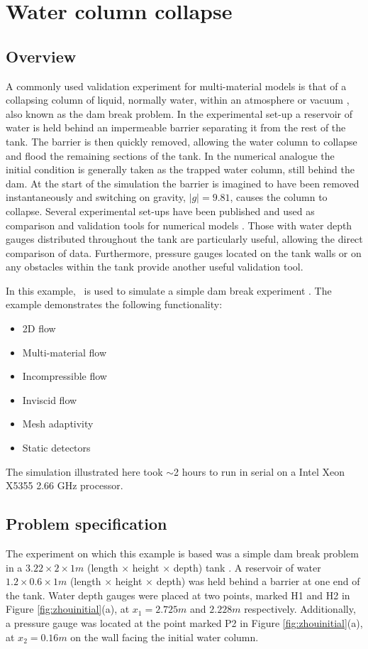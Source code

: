 \section{Water column collapse}
\label{sec:water_collapse}

\subsection{Overview}
A commonly used validation experiment for multi-material models is that of a collapsing column of liquid, normally water, within an atmosphere or vacuum \citep{lakehal_interface_2002}, also known as the dam break problem.  In the experimental set-up a reservoir of water is held behind an impermeable barrier separating it from the rest of the tank.  The barrier is then quickly removed, allowing the water column to collapse and flood the remaining sections of the tank.  In the numerical analogue the initial condition is generally taken as the trapped water column, still behind the dam.  At the start of the simulation the barrier is imagined to have been removed instantaneously and switching on gravity, $|g| = 9.81$, causes the column to collapse.   Several experimental set-ups have been published and used as comparison and validation tools for numerical models \citep{martin_part_1952, greaves_simulation_2006}.  Those with water depth gauges distributed throughout the tank are particularly useful, allowing the direct comparison of data.  Furthermore, pressure gauges located on the tank walls or on any obstacles within the tank provide another useful validation tool.

In this example, \fluidity\ is used to simulate a simple dam break experiment \citep{zhou_nonlinear_1999}.  The example demonstrates the following functionality:

\begin{itemize}
\item 2D flow
\item Multi-material flow
\item Incompressible flow
\item Inviscid flow
\item Mesh adaptivity
\item Static detectors
\end{itemize}

The simulation illustrated here took $\sim$2 hours to run in serial on a Intel Xeon X5355 2.66 GHz processor.

\subsection{Problem specification}
The experiment on which this example is based was a simple dam break problem in a $3.22\times2\times1m$ (length $\times$ height $\times$ depth) tank \citep{zhou_nonlinear_1999}.  A reservoir of water $1.2\times0.6\times1m$ (length $\times$ height $\times$ depth) was held behind a barrier at one end of the tank.  Water depth gauges were placed at two points, marked H1 and H2 in Figure \ref{fig:zhouinitial}(a), at $x_1 = 2.725m$ and $2.228m$ respectively.  Additionally, a pressure gauge was located at the point marked P2 in Figure \ref{fig:zhouinitial}(a), at $x_2=0.16m$ on the wall facing the initial water column.

